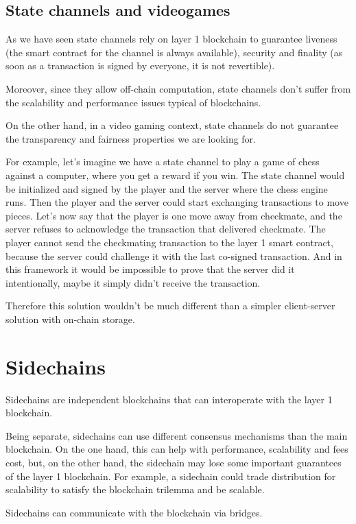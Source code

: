 \documentclass[12pt]{article}
\begin{document}
\subsection{State channels and videogames} \label{subsection:scav}
As we have seen state channels rely on layer 1 blockchain to guarantee liveness (the smart contract for the channel is always available), security and finality (as soon as a transaction is signed by everyone, it is not revertible).

Moreover, since they allow off-chain computation, state channels don't suffer from the scalability and performance issues typical of blockchains.

On the other hand, in a video gaming context, state channels do not guarantee the transparency and fairness properties we are looking for.

For example, let's imagine we have a state channel to play a game of chess against a computer, where you get a reward if you win. The state channel would be initialized and signed by the player and the server where the chess engine runs.
Then the player and the server could start exchanging transactions to move pieces. Let's now say that the player is one move away from checkmate, and the server refuses to acknowledge the transaction that delivered checkmate.
The player cannot send the checkmating transaction to the layer 1 smart contract, because the server could challenge it with the last co-signed transaction. And in this framework it would be impossible to prove that the server did it intentionally, maybe it simply didn't receive the transaction.

Therefore this solution wouldn't be much different than a simpler client-server solution with on-chain storage.

\section{Sidechains} \label{section:sidechains}
Sidechains are independent blockchains that can interoperate with the layer 1 blockchain.

Being separate, sidechains can use different consensus mechanisms than the main blockchain. On the one hand, this can help with performance, scalability and fees cost, but, on the other hand, the sidechain may lose some important guarantees of the layer 1 blockchain.
For example, a sidechain could trade distribution for scalability to satisfy the blockchain trilemma and be scalable.

Sidechains can communicate with the blockchain via bridges.
\end{document}
